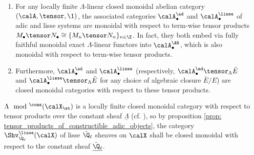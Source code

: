             \begin{proposition} \label{prop: tensor_products_of_constructible_adic_objects}
                \noindent
                \begin{enumerate}
                    \item \cite[Proposition 6.1]{laszlo_olsson_adic_sheaves_on_artin_stacks_2} For any locally finite $\Lambda$-linear closed monoidal abelian category $(\calA, \tensor, \1)$, the associated categories $\calA_{\bullet}^{\ad}$ and $\calA_{\bullet}^{\lisse}$ of adic and lisse systems are monoidal with respect to term-wise tensor products $M_{\bullet} \tensor N_{\bullet} \cong \{M_n \tensor N_n\}_{n \in \Z}$. In fact, they both embed via fully faithful monoidal exact $\Lambda$-linear functors into $\calA_{\bullet}^{\AR}$, which is also monoidal with respect to term-wise tensor products. 
                    \item \cite[Theorem III.12.2 and Appendix A]{kiehl_weissauer_weil_conjecture_perverse_sheaves_and_l_adic_fourier_transform} Furthermore, $\calA_{\bullet}^{\ad}$ and $\calA_{\bullet}^{\lisse}$ (respectively, $\calA_{\bullet}^{\ad} \tensor_{\Lambda} \bar{E}$ and $\calA_{\bullet}^{\lisse} \tensor_{\Lambda} \bar{E}$ for any choice of algebraic closure $\bar{E}/E$) are closed monoidal categories with respect to these tensor products.
                \end{enumerate}
            \end{proposition}
            \begin{example} \label{def: tensor_products_of_constructible_adic_sheaves}
                $\Lambda\mod^{\cons}(\calX_{\et})$ is a locally finite closed monoidal category with respect to tensor products over the constant sheaf $\underline{\Lambda}$ (cf. \cite[\href{https://stacks.math.columbia.edu/tag/093P}{Tag 093P}]{stacks}), so by proposition \ref{prop: tensor_products_of_constructible_adic_objects}, the category $\Shv_{\bar{\Q}_{\ell}}^{\lisse}(\calX)$ of lisse $\bar{\Q}_{\ell}$ sheaves on $\calX$ shall be closed monoidal with respect to the constant sheaf $\underline{\bar{\Q}_{\ell}}$.
            \end{example}
            
